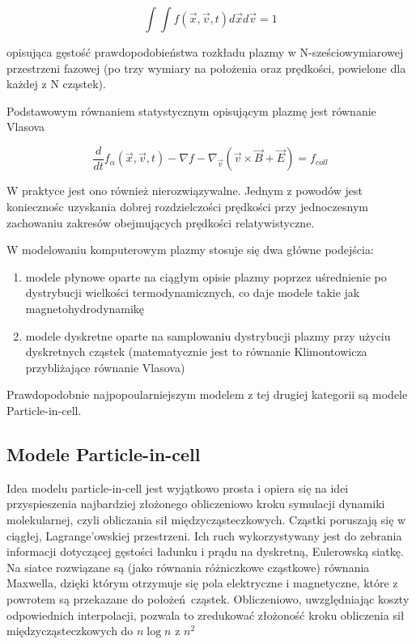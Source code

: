 \begin{equation}
    \int \int f(\vec{x}, \vec{v}, t) d\vec{x} d\vec{v} = 1 %
    \label{eqn:distribution-function}
\end{equation}


opisująca gęstość prawdopodobieństwa rozkładu plazmy w N-sześciowymiarowej przestrzeni fazowej (po trzy wymiary na położenia
oraz prędkości, powielone dla każdej z N cząstek).


Podstawowym równaniem statystycznym opisującym plazmę jest równanie Vlasova %

\begin{equation}
    \frac{ d} {dt} f_{\alpha} (\vec{x}, \vec{v}, t) - \nabla f - \nabla_\vec{v} (\vec{v} \times \vec{B} + \vec{E})= f_{coll}
    \label{eqn:Vlasov}
\end{equation}

W praktyce jest ono również nierozwiązywalne. Jednym z powodów jest koniecznośc uzyskania dobrej rozdzielczości prędkości
przy jednoczesnym zachowaniu zakresów obejmujących prędkości relatywistyczne. %

W modelowaniu komputerowym plazmy stosuje się dwa główne podejścia:
\begin{enumerate}
\item modele płynowe oparte na ciągłym opisie plazmy poprzez uśrednienie po dystrybucji
wielkości termodynamicznych, co daje modele takie jak magnetohydrodynamikę %
\item modele dyskretne oparte na samplowaniu dystrybucji plazmy przy użyciu dyskretnych cząstek
        (matematycznie jest to równanie Klimontowicza przybliżające równanie Vlasova) %
\end{enumerate}

Prawdopodobnie najpopoularniejszym modelem z tej drugiej kategorii są modele Particle-in-cell.

\subsection{Modele Particle-in-cell}

Idea modelu particle-in-cell jest wyjątkowo prosta i opiera się na idei przyspieszenia najbardziej złożonego obliczeniowo kroku
symulacji dynamiki molekularnej, czyli obliczania sił międzycząsteczkowych. Cząstki poruszają się w ciągłej, Lagrange'owskiej przestrzeni.
Ich ruch wykorzystywany jest do zebrania informacji dotyczącej gęstości ładunku i prądu na dyskretną, Eulerowską siatkę. Na siatce rozwiązane
są (jako równania różniczkowe cząstkowe) równania Maxwella, dzięki którym otrzymuje się pola elektryczne i magnetyczne, które z powrotem są przekazane
do położeń cząstek. Obliczeniowo, uwzględniając koszty odpowiednich interpolacji, pozwala to zredukować złożoność kroku obliczenia sił międzycząsteczkowych
do $n \log{n}$ z $n^2$ %

